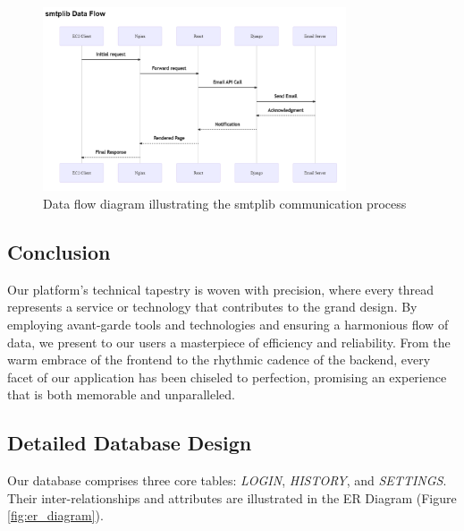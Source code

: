 \documentclass[12pt]{article}
\begin{document}
\begin{figure}[ht]
	\centering
	\includegraphics[width=0.8\textwidth]{smtplib_flow.png}
	\caption{Data flow diagram illustrating the smtplib communication process}
	\label{fig:smtplib_flow}
\end{figure}

\subsection{Conclusion}

Our platform's technical tapestry is woven with precision, where every thread represents a service or technology that contributes to the grand design. By employing avant-garde tools and technologies and ensuring a harmonious flow of data, we present to our users a masterpiece of efficiency and reliability. From the warm embrace of the frontend to the rhythmic cadence of the backend, every facet of our application has been chiseled to perfection, promising an experience that is both memorable and unparalleled.


\subsection{Detailed Database Design}

Our database comprises three core tables: \textit{LOGIN}, \textit{HISTORY}, and \textit{SETTINGS}. Their inter-relationships and attributes are illustrated in the ER Diagram (Figure \ref{fig:er_diagram}). 
\end{document}
